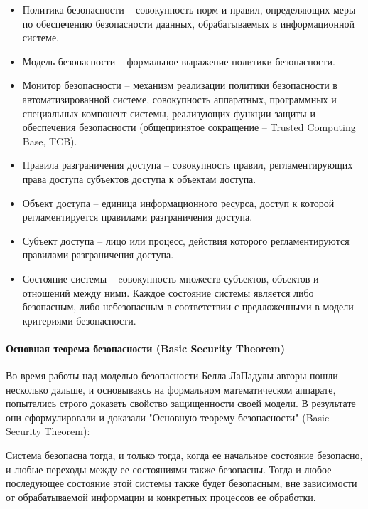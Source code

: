 \begin{itemize}
	\item Политика безопасности -- совокупность норм и правил, определяющих меры по обеспечению безопасности даанных, обрабатываемых в информационной системе.
	\item Модель безопасности -- формальное выражение политики безопасности.
	\item Монитор безопасности -- механизм реализации политики безопасности в автоматизированной системе, совокупность аппаратных, программных и специальных компонент системы, реализующих функции защиты и обеспечения безопасности (общепринятое сокращение -- Trusted Computing Base, TCB).
	\item Правила разграничения доступа -- совокупность правил, регламентирующих права доступа субъектов доступа к объектам доступа.
	\item Объект доступа -- единица информационного ресурса, доступ к которой регламентируется правилами разграничения доступа.
	\item Субъект доступа -- лицо или процесс, действия которого регламентируются правилами разграничения доступа.
	\item Состояние системы -- cовокупность множеств субъектов, объектов и отношений между ними. Каждое состояние системы является либо безопасным, либо небезопасным в соответствии с предложенными в модели критериями безопасности.
\end{itemize}

\paragraph{Основная теорема безопасности (Basic Security Theorem)}

Во время работы над моделью безопасности Белла-ЛаПадулы авторы пошли несколько дальше, и основываясь на формальном математическом аппарате, попытались строго доказать свойство защищенности своей модели. В результате они сформулировали и доказали "Основную теорему безопасности" (Basic Security Theorem): 

\begin{grayquote}
Система безопасна тогда, и только тогда, когда ее начальное состояние безопасно, и любые переходы между ее состояниями также безопасны. Тогда и любое последующее состояние этой системы также будет безопасным, вне зависимости от обрабатываемой информации и конкретных процессов ее обработки. 
\end{grayquote}


